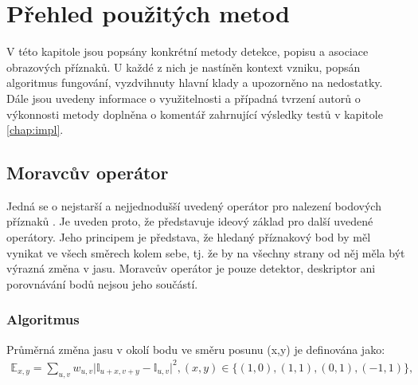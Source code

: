 


\chapter{Přehled použitých metod}
\label{chap:prehled}

V této kapitole jsou popsány konkrétní metody detekce, popisu a asociace obrazových příznaků. U každé z nich je nastíněn kontext vzniku, popsán algoritmus fungování, vyzdvihnuty hlavní klady a upozorněno na nedostatky. Dále jsou uvedeny informace o využitelnosti a případná tvrzení autorů o výkonnosti metody doplněna o komentář zahrnující výsledky testů v kapitole \ref{chap:impl}.

\section{Moravcův operátor}

Jedná se o nejstarší a nejjednodušší uvedený operátor pro nalezení bodových příznaků \cite{moravec1980obstacle}. Je uveden proto, že představuje ideový základ pro další uvedené operátory. Jeho principem je představa, že hledaný příznakový bod by měl vynikat ve všech směrech kolem sebe, tj. že by na všechny strany od něj měla být výrazná změna v jasu. Moravcův operátor je pouze detektor, deskriptor ani porovnávání bodů nejsou jeho součástí.

\subsection{Algoritmus}

Průměrná změna jasu v okolí bodu ve směru posunu (x,y) je definována jako:
\begin{align}	
\mathbb{E}_{x,y} = \sum_{u,v} w_{u,v} \lvert \mathbb{I}_{u+x, v+y} - \mathbb{I}_{u,v} \rvert^2 , (x,y) \in \{(1,0), (1,1), (0,1), (-1,1)\},
\end{align}

